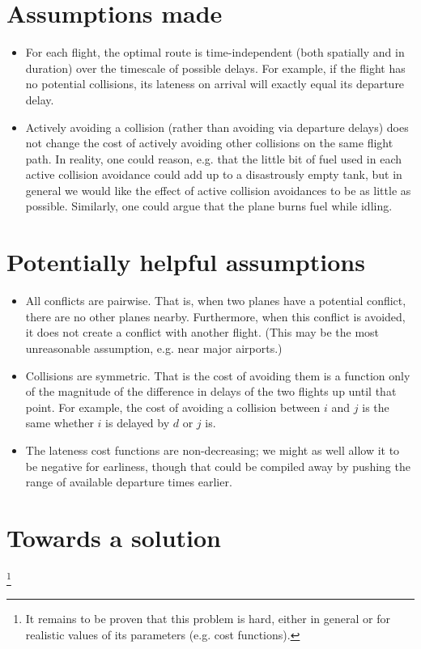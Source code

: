 \documentclass{article}
\begin{document}
\section{Assumptions made}
\begin{itemize}
\item For each flight, the optimal route is time-independent (both spatially and in duration) over the timescale of possible delays.
For example, if the flight has no potential collisions, its lateness on arrival will exactly equal its departure delay.
\item Actively avoiding a collision (rather than avoiding via departure delays) does not change the cost of actively avoiding other collisions on the same flight path. In reality, one could reason, e.g. that the little bit of fuel used in each active collision avoidance could add up to a disastrously empty tank, but in general we would like the effect of active collision avoidances to be as little as possible.
Similarly, one could argue that the plane burns fuel while idling.
\end{itemize}

\section{Potentially helpful assumptions}
\begin{itemize}
\item All conflicts are pairwise. That is, when two planes have a potential conflict, there are no other planes nearby. 
Furthermore, when this conflict is avoided, it does not create a conflict with another flight. 
(This may be the most unreasonable assumption, e.g. near major airports.)
\item Collisions are symmetric. That is the cost of avoiding them is a function only of the magnitude of the difference in delays of the two flights up until that point. For example, the cost of avoiding a collision between $i$ and $j$ is the same whether $i$ is delayed by $d$ or $j$ is.
\item The lateness cost functions are non-decreasing; we might as well allow it to be negative for earliness, though that could be compiled away by pushing the range of available departure times earlier.
\end{itemize}

\section{Towards a solution}\footnote{
It remains to be proven that this problem is hard, either in general or for realistic values of its parameters (e.g. cost functions).}
\end{document}
